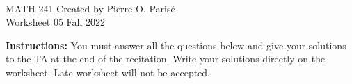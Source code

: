 \documentclass[addpoints, 12pt]{exam}%
\theoremstyle{definition}
\begin{document}
	\noindent \hrulefill \\
	MATH-241 \hfill Created by Pierre-O. Paris{\'e}\\
	Worksheet 05 \hfill Fall 2022\\\vspace*{-0.7cm}
	
	\noindent\hrulefill
	
\vspace*{0.5cm}

\noindent{}

\vspace*{0.25cm}
\begin{center}
\gradetable[h][questions]
\end{center}
\vspace*{0.25cm}

{\bf Instructions:} You must answer all the questions below and give your solutions to the TA at the end of the recitation. Write your solutions directly on the worksheet. Late worksheet will not be accepted.


\vspace*{0.5cm}
\end{document}
